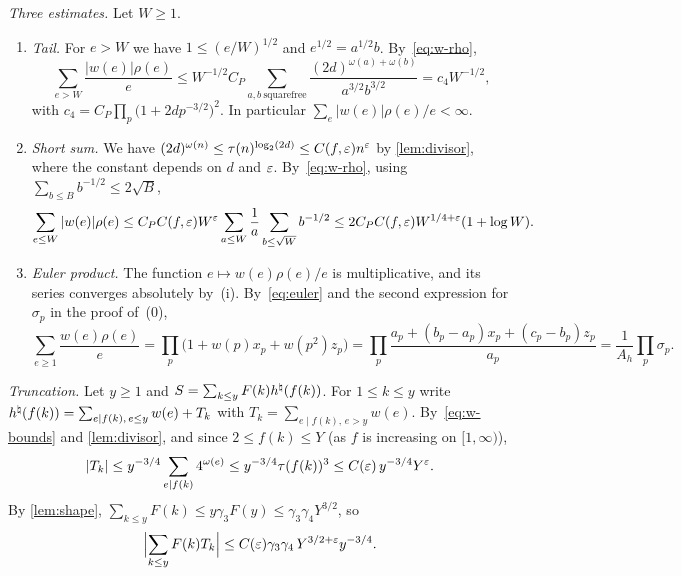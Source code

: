 \emph{Three estimates.} Let $W\ge1$.
\begin{enumerate}[label=(\roman*)]
\item \emph{Tail.} For $e>W$ we have $1\le(e/W)^{1/2}$ and $e^{1/2}=a^{1/2}b$. By~\eqref{eq:w-rho},
\begin{equation}\label{eq:w-tail}
\sum_{e>W}\frac{|w(e)|\rho(e)}e\le W^{-1/2}C_P\sum_{a,b\ \mathrm{squarefree}}\frac{(2d)^{\omega(a)+\omega(b)}}{a^{3/2}b^{3/2}}=c_4W^{-1/2},
\end{equation}
with $c_4=C_P\prod_p\bigl(1+2dp^{-3/2}\bigr)^2$.
In particular $\sum_e|w(e)|\rho(e)/e<\infty$.
\item \emph{Short sum.} We have $(2d)^{\omega(n)}\le\tau(n)^{\log_2(2d)}\le C(f,\varepsilon)n^\varepsilon$ by \cref{lem:divisor}, where the constant depends on $d$ and $\varepsilon$. By~\eqref{eq:w-rho}, using $\sum_{b\le B}b^{-1/2}\le2\sqrt B$,
\begin{equation}\label{eq:w-short}
\sum_{e\le W}|w(e)|\rho(e)\le C_PC(f,\varepsilon)W^\varepsilon\sum_{a\le W}\frac1a\sum_{b\le\sqrt W}b^{-1/2}\le2C_PC(f,\varepsilon)W^{1/4+\varepsilon}(1+\log W).
\end{equation}
\item \emph{Euler product.} The function $e\mapsto w(e)\rho(e)/e$ is multiplicative, and its series converges absolutely by~(i). By~\eqref{eq:euler} and the second expression for $\sigma_p$ in the proof of~(0),
\begin{equation}\label{eq:w-euler}
\sum_{e\ge1}\frac{w(e)\rho(e)}e=\prod_p\bigl(1+w(p)x_p+w(p^2)z_p\bigr)=\prod_p\frac{a_p+(b_p-a_p)x_p+(c_p-b_p)z_p}{a_p}=\frac1{A_h}\prod_p\sigma_p .
\end{equation}
\end{enumerate}

\emph{Truncation.} Let $y\ge1$ and $S=\sum_{k\le y}F(k)h^{\natural}(f(k))$. For $1\le k\le y$ write $h^{\natural}(f(k))=\sum_{e\mid f(k),\,e\le y}w(e)+T_k$ with $T_k=\sum_{e\mid f(k),\,e>y}w(e)$. By~\eqref{eq:w-bounds} and \cref{lem:divisor}, and since $2\le f(k)\le Y$ (as $f$ is increasing on $[1,\infty)$),
\[
|T_k|\le y^{-3/4}\sum_{e\mid f(k)}4^{\omega(e)}\le y^{-3/4}\tau(f(k))^3\le C(\varepsilon)\,y^{-3/4}Y^\varepsilon .
\]
By \cref{lem:shape}, $\sum_{k\le y}F(k)\le y\gamma_3F(y)\le\gamma_3\gamma_4Y^{3/2}$, so
\begin{equation}\label{eq:trunc}
\Bigl|\sum_{k\le y}F(k)T_k\Bigr|\le C(\varepsilon)\gamma_3\gamma_4\,Y^{3/2+\varepsilon}y^{-3/4}.
\end{equation}

